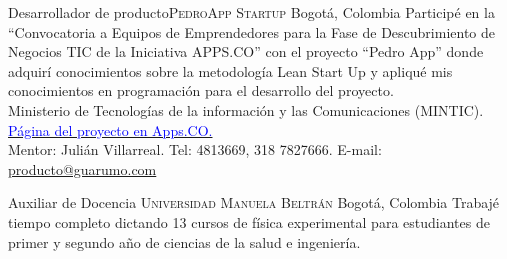 \documentclass[12pt,letterpaper,sans]{moderncv}
\begin{document}
          
        {Desarrollador de producto}{\textsc{PedroApp Startup}}
        {Bogot\'a, Colombia}{}
        {Participé en la ``Convocatoria a Equipos de Emprendedores para la Fase de Descubrimiento de
          Negocios TIC de la Iniciativa APPS.CO'' con el proyecto ``Pedro App'' donde adquirí conocimientos
          sobre la metodología Lean Start Up y apliqué mis conocimientos en programación para el desarrollo
          del proyecto.\\
          Ministerio de Tecnolog\'ias de la informaci\'on y las Comunicaciones (MINTIC).
          \href{https://apps.co/comunidad/ver/1785/pedro-e-commerce-multiplataforma-web-app-whatsapp-}
               {\textcolor{blue}{Página del proyecto en Apps.CO.}}
               \\
               Mentor:  Julián Villarreal. Tel: 4813669, 318 7827666. E-mail:
                         \url{producto@guarumo.com}
        }

        {Auxiliar de Docencia}
        {\textsc{Universidad Manuela Beltr\'an}}
        {Bogot\'a, Colombia}{}
        { Trabajé tiempo completo dictando 13 cursos de física experimental para estudiantes de
          primer y segundo año de ciencias de la salud e ingeniería.}
        
\end{document}

